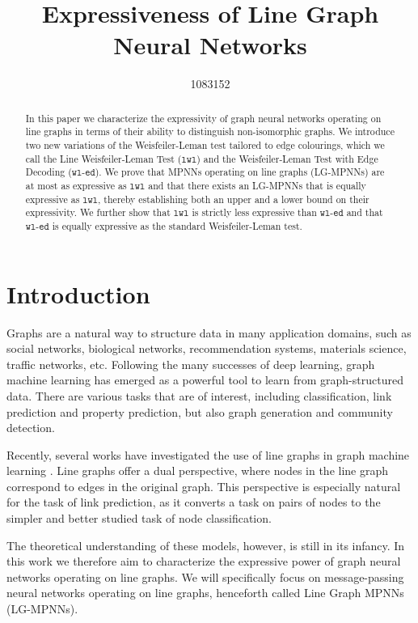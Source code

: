 \documentclass{article}
\title{Expressiveness of Line Graph Neural Networks}
\author{%
    1083152
}
\newcommand{\wledge}{\texttt{wl-ed}}
\newcommand{\lwl}{\texttt{lwl}}
\begin{document}
\maketitle


\begin{abstract}
    In this paper we characterize the expressivity of graph neural networks operating on line graphs in terms of their ability to distinguish non-isomorphic graphs. We introduce two new variations of the Weisfeiler-Leman test tailored to edge colourings, which we call the Line Weisfeiler-Leman Test ($\lwl$) and the Weisfeiler-Leman Test with Edge Decoding ($\wledge$). We prove that MPNNs operating on line graphs (LG-MPNNs) are at most as expressive as $\lwl$ and that there exists an LG-MPNNs that is equally expressive as $\lwl$, thereby establishing both an upper and a lower bound on their expressivity. We further show that $\lwl$ is strictly less expressive than $\wledge$ and that $\wledge$ is equally expressive as the standard Weisfeiler-Leman test.
\end{abstract}


\section{Introduction}
Graphs are a natural way to structure data in many application domains, such as social networks, biological networks, recommendation systems, materials science, traffic networks, etc.
Following the many successes of deep learning, graph machine learning has emerged as a powerful tool to learn from graph-structured data. There are various tasks that are of interest, including classification, link prediction and property prediction, but also graph generation and community detection.

Recently, several works have investigated the use of line graphs in graph machine learning \cite{cai2021line,choudhary2021atomistic}. Line graphs offer a dual perspective, where nodes in the line graph correspond to edges in the original graph. This perspective is especially natural for the task of link prediction, as it converts a task on pairs of nodes to the simpler and better studied task of node classification.

The theoretical understanding of these models, however, is still in its infancy.
In this work we therefore aim to characterize the expressive power of graph neural networks operating on line graphs. We will specifically focus on message-passing neural networks operating on line graphs, henceforth called Line Graph MPNNs (LG-MPNNs).
\end{document}
